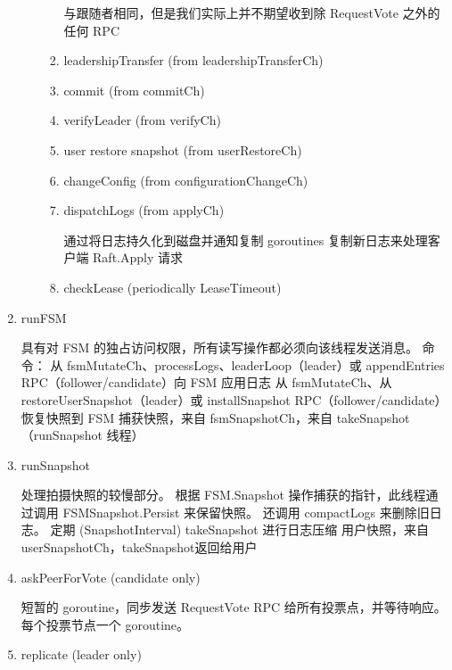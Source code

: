 \begin{enumerate}
\begin{enumerate}
\begin{enumerate}
						与跟随者相同，但是我们实际上并不期望收到除 RequestVote 之外的任何 RPC

						\item leadershipTransfer (from leadershipTransferCh) 
						
						\item commit (from commitCh) 
						
						\item verifyLeader (from verifyCh) 
						
						\item user restore snapshot (from userRestoreCh) 
						
						\item changeConfig (from configurationChangeCh) 
						
						\item dispatchLogs (from applyCh) 
						
						通过将日志持久化到磁盘并通知复制 goroutines 复制新日志来处理客户端 Raft.Apply 请求
						
						\item checkLease (periodically LeaseTimeout) 
						
					\end{enumerate}
				\end{enumerate}
				
				
				\item runFSM 
				
				具有对 FSM 的独占访问权限，所有读写操作都必须向该线程发送消息。 命令：
从 fsmMutateCh、processLogs、leaderLoop（leader）或 appendEntries RPC（follower/candidate）向 FSM 应用日志
从 fsmMutateCh、从 restoreUserSnapshot（leader）或 installSnapshot RPC（follower/candidate）恢复快照到 FSM
捕获快照，来自 fsmSnapshotCh，来自 takeSnapshot（runSnapshot 线程）

				\item runSnapshot
				
				处理拍摄快照的较慢部分。 根据 FSM.Snapshot 操作捕获的指针，此线程通过调用 FSMSnapshot.Persist 来保留快照。 还调用 compactLogs 来删除旧日志。
定期 (SnapshotInterval) takeSnapshot 进行日志压缩
用户快照，来自userSnapshotCh，takeSnapshot返回给用户
				
				\item askPeerForVote (candidate only)
				
				短暂的 goroutine，同步发送 RequestVote RPC 给所有投票点，并等待响应。 每个投票节点一个 goroutine。
				
				\item replicate (leader only)
				

\end{enumerate}
